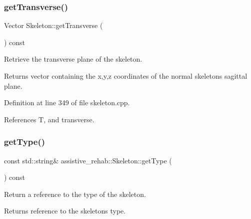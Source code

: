 \mbox{\label{classassistive__rehab_1_1Skeleton_a35c3cdea575eb474a2cb8e0186011cff}} 
\subsubsection{\texorpdfstring{getTransverse()}{getTransverse()}}
{\footnotesize\ttfamily Vector Skeleton\+::get\+Transverse (\begin{DoxyParamCaption}{ }\end{DoxyParamCaption}) const}



Retrieve the transverse plane of the skeleton. 

\begin{DoxyReturn}{Returns}
vector containing the x,y,z coordinates of the normal skeleton\textquotesingle{}s sagittal plane. 
\end{DoxyReturn}


Definition at line 349 of file skeleton.\+cpp.


\begin{DoxyCode}{0}

\end{DoxyCode}


References T, and transverse.

\mbox{\label{classassistive__rehab_1_1Skeleton_a4efc4844bd2b185f1080ee52ab69cb04}} 
\subsubsection{\texorpdfstring{getType()}{getType()}}
{\footnotesize\ttfamily const std\+::string\& assistive\+\_\+rehab\+::\+Skeleton\+::get\+Type (\begin{DoxyParamCaption}{ }\end{DoxyParamCaption}) const\hspace{0.3cm}{\ttfamily [inline]}}



Return a reference to the type of the skeleton. 

\begin{DoxyReturn}{Returns}
reference to the skeleton\textquotesingle{}s type. 
\end{DoxyReturn}


